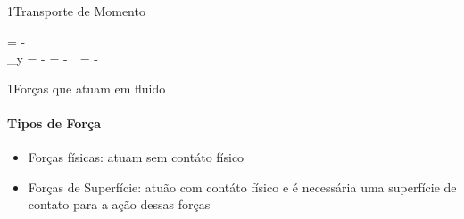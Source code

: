 \documentclass[\mainfilename]{subfiles}
\begin{document}
\begin{sectionBox}1{Transporte de Momento}
    
    \begin{BM}
        \Psi = -\delta{}
        \\
        \tau_y
        = - \nu{}
        = - \nu\,\rho\,
        = - \mu{}
    \end{BM}
    
\end{sectionBox}

\begin{sectionBox}1{Forças que atuam em fluido}
    
    \paragraph{Tipos de Força}
    \begin{itemize}
        \item Forças físicas: atuam sem contáto físico
        \item Forças de Superfície: atuão com contáto físico e é necessária uma superfície de contato para a ação dessas forças 
    \end{itemize}
    
\end{sectionBox}
\end{document}
